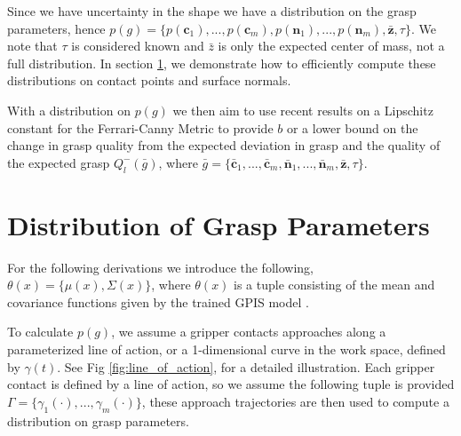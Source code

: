 \documentclass[letterpaper, 10 pt, conference]{ieeeconf}  %
\begin{document}
Since we have uncertainty in the shape we have a distribution on the grasp parameters, hence $p(g) = \lbrace p(\textbf{c}_1),...,p(\textbf{c}_m),p(\textbf{n}_1),...,p(\textbf{n}_m),\bar{\textbf{z}},\tau \rbrace$.
We note that $\tau$ is considered known and $\bar{z}$ is only the expected center of mass, not a full distribution. In section \ref{sec:distgrasp}, we demonstrate how to efficiently compute these distributions on contact points and surface normals. 

With a distribution on $p(g)$ we then aim to use recent results on a Lipschitz constant for the Ferrari-Canny Metric \cite{pokorny2013classical} to provide $b$ or a lower bound on the change in grasp quality from the expected deviation in grasp and the quality of the expected grasp $Q_l^-(\bar{g})$, where $\bar{g} = \lbrace \bar{\textbf{c}}_1,...,\bar{\textbf{c}}_m,\bar{\textbf{n}}_1,...,\bar{\textbf{n}}_m,\bar{\textbf{z}},\tau \rbrace$.



\section{Distribution of Grasp Parameters}
\label{sec:distgrasp}

 For the following derivations we introduce the following,
 $\theta(x) = \lbrace \mu(x),\Sigma(x) \rbrace$, where $\theta(x)$ is a tuple consisting of the mean and covariance functions given by the trained GPIS model \cite{rasmussen2006} . 
 
 To calculate $p(g)$, we assume a gripper contacts approaches along a parameterized line of action, or a 1-dimensional curve in the work space, defined by $\gamma(t)$. See Fig \ref{fig:line_of_action}, for a detailed illustration. Each gripper contact is defined by a line of action, so we assume the following tuple is provided $\Gamma = \lbrace \gamma_1(\cdot),...,\gamma_m(\cdot) \rbrace$, these approach trajectories are then used to compute a distribution on grasp parameters. 
 



\end{document}
